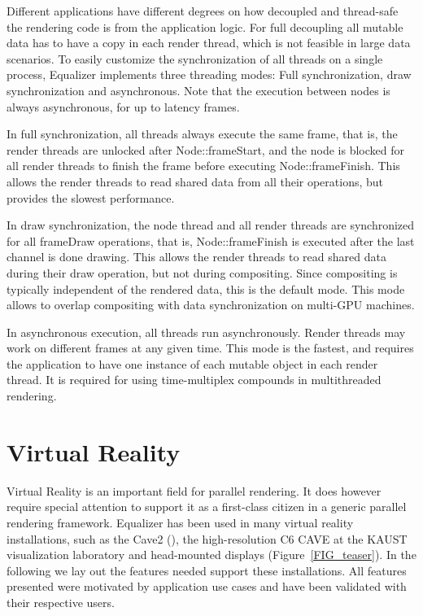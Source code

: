 \documentclass[10pt,journal,compsoc]{IEEEtran}
\newcommand{\fig}[1]{Figure~\ref{#1}}
\begin{document}
Different applications have different degrees on how decoupled and thread-safe
the rendering code is from the application logic. For full decoupling all
mutable data has to have a copy in each render thread, which is not feasible in
large data scenarios. To easily customize the synchronization of all threads on
a single process, Equalizer implements three threading modes:  Full
synchronization, draw synchronization and asynchronous. Note that the execution
between nodes is always asynchronous, for up to \textsf{latency} frames.

In full synchronization, all threads always execute the same frame, that is, the
render threads are unlocked after \textsf{Node::frameStart}, and the node is
blocked for all render threads to finish the frame before executing
\textsf{Node::frameFinish}. This allows the render threads to read shared data
from all their operations, but provides the slowest performance.

In draw synchronization, the node thread and all render threads are synchronized
for all \textsf{frameDraw} operations, that is, \textsf{Node::frameFinish} is
executed after the last channel is done drawing. This allows the render threads
to read shared data during their draw operation, but not during
compositing. Since compositing is typically independent of the rendered data,
this is the default mode. This mode allows to overlap compositing with data
synchronization on multi-GPU machines.

In asynchronous execution, all threads run asynchronously. Render threads may
work on different frames at any given time. This mode is the fastest, and
requires the application to have one instance of each mutable object in each
render thread. It is required for using time-multiplex compounds in
multithreaded rendering.

\section{Virtual Reality}

Virtual Reality is an important field for parallel rendering. It does however
require special attention to support it as a first-class citizen in a generic
parallel rendering framework. Equalizer has been used in many virtual reality
installations, such as the Cave2 (\cite{FNTTL:13}), the high-resolution C6 CAVE
at the KAUST visualization laboratory and head-mounted displays
(\fig{FIG_teaser}). In the following we lay out the features needed support
these installations. All features presented were motivated by application use
cases and have been validated with their respective users.
\end{document}
